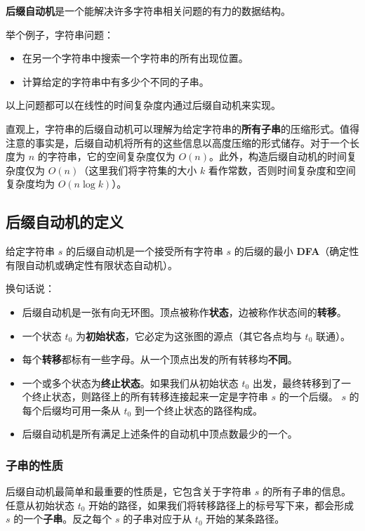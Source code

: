 \textbf{后缀自动机}是一个能解决许多字符串相关问题的有力的数据结构。

举个例子，字符串问题：

\begin{itemize}
\item
  在另一个字符串中搜索一个字符串的所有出现位置。
\item
  计算给定的字符串中有多少个不同的子串。
\end{itemize}

以上问题都可以在线性的时间复杂度内通过后缀自动机来实现。

直观上，字符串的后缀自动机可以理解为给定字符串的\textbf{所有子串}的压缩形式。值得注意的事实是，后缀自动机将所有的这些信息以高度压缩的形式储存。对于一个长度为
\(n\) 的字符串，它的空间复杂度仅为
\(O(n)\)。此外，构造后缀自动机的时间复杂度仅为
\(O(n)\)（这里我们将字符集的大小 \(k\)
看作常数，否则时间复杂度和空间复杂度均为 \(O(n\log k)\)）。

\subsection{后缀自动机的定义}

给定字符串 \(s\) 的后缀自动机是一个接受所有字符串 \(s\) 的后缀的最小
\textbf{DFA}（确定性有限自动机或确定性有限状态自动机）。

换句话说：

\begin{itemize}
\item
  后缀自动机是一张有向无环图。顶点被称作\textbf{状态}，边被称作状态间的\textbf{转移}。
\item
  一个状态 \(t_0\)
  为\textbf{初始状态}，它必定为这张图的源点（其它各点均与 \(t_0\)
  联通）。
\item
  每个\textbf{转移}都标有一些字母。从一个顶点出发的所有转移均\textbf{不同}。
\item
  一个或多个状态为\textbf{终止状态}。如果我们从初始状态 \(t_0\)
  出发，最终转移到了一个终止状态，则路径上的所有转移连接起来一定是字符串
  \(s\) 的一个后缀。 \(s\) 的每个后缀均可用一条从 \(t_0\)
  到一个终止状态的路径构成。
\item
  后缀自动机是所有满足上述条件的自动机中顶点数最少的一个。
\end{itemize}

\subsubsection{子串的性质}

后缀自动机最简单和最重要的性质是，它包含关于字符串 \(s\)
的所有子串的信息。任意从初始状态 \(t_0\)
开始的路径，如果我们将转移路径上的标号写下来，都会形成 \(s\)
的一个\textbf{子串}。反之每个 \(s\) 的子串对应于从 \(t_0\)
开始的某条路径。

